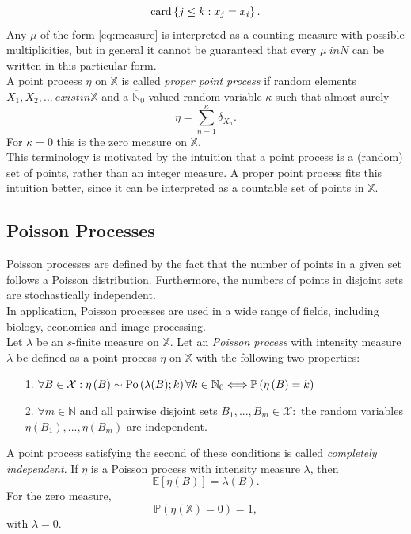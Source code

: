 \begin{equation*}
    \hbox{card}\left\lbrace j\leq k:x_j=x_i\right\rbrace.
\end{equation*}
Any $\mu$ of the form \eqref{eq:measure} is interpreted as a counting measure with possible multiplicities, but in general it cannot be guaranteed that every $\mu\ in N$ can be written in this particular form. \\
A point process $\eta$ on $\mathbb{X}$ is called \textit{proper point process} if random elements $X_1,X_2,...\ exist in \mathbb{X}$ and a $\overline{\mathbb{N}}_0$-valued random variable $\kappa$ such that almost surely
\begin{equation}
    \eta=\sum_{n=1}^{\kappa}\delta_{X_n}.
\end{equation}
For $\kappa=0$ this is the zero measure on $\mathbb{X}$. \\
This terminology is motivated by the intuition that a point process is a (random) set of points, rather than an integer measure. A proper point process fits this intuition better, since it can be interpreted as a countable set of points in $\mathbb{X}$.
\subsection{Poisson Processes}
Poisson processes are defined by the fact that the number of points in a given set follows a Poisson distribution. Furthermore, the numbers of points in disjoint sets are stochastically independent. \\
In application, Poisson processes are used in a wide range of fields, including biology, economics and image processing. \\
Let $\lambda$ be an $s$-finite measure on $\mathbb{X}$. Let an \textit{Poisson process} with intensity measure $\lambda$ be defined as a point process $\eta$ on $\mathbb{X}$ with the following two properties:
\begin{itemize}
    \item[1.] $\forall B\in\mathcal{X}: \eta\left(B\right)\sim\hbox{Po}\left(\lambda(B);k\right)\forall k\in\mathbb{N}_0 \Longleftrightarrow \mathbb{P}\left(\eta\left(B\right)=k\right)$
    \item[2.] 
    $\forall m\in\mathbb{N}$ and all pairwise disjoint sets $B_1,...,B_m\in\mathcal{X}:$ the random variables $\eta\left(B_1\right),...,\eta\left(B_m\right)$ are independent.
\end{itemize}
A point process satisfying the second of these conditions is called \textit{completely independent}. If $\eta$ is a Poisson process with intensity measure $\lambda$, then
\begin{equation}
    \mathbb{E}\left[\eta\left(B\right)\right]=\lambda(B).
\end{equation}
For the zero measure,
\begin{equation*}
    \mathbb{P}\left(\eta(\mathbb{X})=0\right)=1,
\end{equation*}
with $\lambda=0$\autocite[Cf.][]{last2017lectures}.

